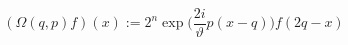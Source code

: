\begin{equation}
	(\Omega(q,p)f)(x):=2^{n}\exp\Big(\frac{2i}{\vartheta}p(x-q)\Big)f(2q-x)
\end{equation}


